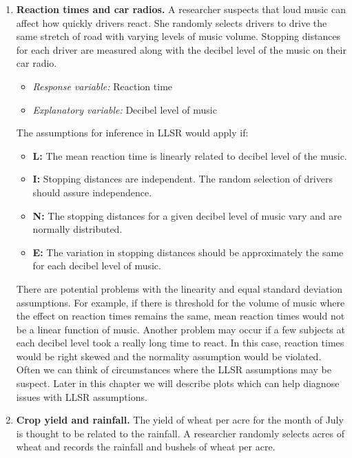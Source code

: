 \documentclass[
]{krantz}
\providecommand{\tightlist}{%
  \setlength{\itemsep}{0pt}\setlength{\parskip}{0pt}}
\begin{document}
\begin{enumerate}
\def\labelenumi{\arabic{enumi})}
\item
  \textbf{Reaction times and car radios.} A researcher suspects that loud music can affect how quickly drivers react. She randomly selects drivers to drive the same stretch of road with varying levels of music volume. Stopping distances for each driver are measured along with the decibel level of the music on their car radio.

  \begin{itemize}
  \tightlist
  \item
    \emph{Response variable:} Reaction time
  \item
    \emph{Explanatory variable:} Decibel level of music
  \end{itemize}

  The assumptions for inference in LLSR would apply if:

  \begin{itemize}
  \tightlist
  \item
    \textbf{L:} The mean reaction time is linearly related to decibel level of the music.
  \item
    \textbf{I:} Stopping distances are independent. The random selection of drivers should assure independence.
  \item
    \textbf{N:} The stopping distances for a given decibel level of music vary and are normally distributed.
  \item
    \textbf{E:} The variation in stopping distances should be approximately the same for each decibel level of music.
  \end{itemize}

  There are potential problems with the linearity and equal standard deviation assumptions. For example, if there is threshold for the volume of music where the effect on reaction times remains the same, mean reaction times would not be a linear function of music. Another problem may occur if a few subjects at each decibel level took a really long time to react. In this case, reaction times would be right skewed and the normality assumption would be violated. Often we can think of circumstances where the LLSR assumptions may be suspect. Later in this chapter we will describe plots which can help diagnose issues with LLSR assumptions.
\item
  \textbf{Crop yield and rainfall.} The yield of wheat per acre for the month of July is thought to be related to the rainfall. A researcher randomly selects acres of wheat and records the rainfall and bushels of wheat per acre.


\end{enumerate}
\end{document}
